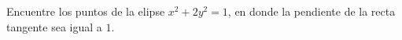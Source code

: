 \item Encuentre los puntos de la elipse $x^2 + 2y^2 = 1$, en donde la pendiente de la recta tangente sea igual a $1$.
